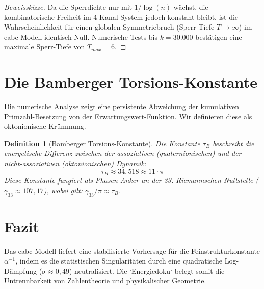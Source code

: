 \documentclass[11pt,a4paper]{article}
\newtheorem{definition}{Definition}
\begin{document}
	\begin{proof}[Beweisskizze]
		Da die Sperrdichte nur mit $1/\log(n)$ wächst, die kombinatorische Freiheit im 4-Kanal-System jedoch konstant bleibt, ist die Wahrscheinlichkeit für einen globalen Symmetriebruch (Sperr-Tiefe $T \to \infty$) im eabc-Modell identisch Null. Numerische Tests bis $k=30.000$ bestätigen eine maximale Sperr-Tiefe von $T_{max} = 6$.
	\end{proof}
	
	\section{Die Bamberger Torsions-Konstante}
	
	Die numerische Analyse zeigt eine persistente Abweichung der kumulativen Primzahl-Besetzung von der Erwartungswert-Funktion. Wir definieren diese als oktonionische Krümmung.
	
	\begin{definition}[Bamberger Torsions-Konstante]
		Die Konstante $\tau_B$ beschreibt die energetische Differenz zwischen der assoziativen (quaternionischen) und der nicht-assoziativen (oktonionischen) Dynamik:
		\begin{equation}
			\tau_B \approx 34,518 \approx 11 \cdot \pi
		\end{equation}
		Diese Konstante fungiert als Phasen-Anker an der 33. Riemannschen Nullstelle ($\gamma_{33} \approx 107,17$), wobei gilt: $\gamma_{33} / \pi \approx \tau_B$.
	\end{definition}
	
	\section{Fazit}
	Das eabc-Modell liefert eine stabilisierte Vorhersage für die Feinstrukturkonstante $\alpha^{-1}$, indem es die statistischen Singularitäten durch eine quadratische Log-Dämpfung ($\sigma \approx 0,49$) neutralisiert. Die `Energiedoku` belegt somit die Untrennbarkeit von Zahlentheorie und physikalischer Geometrie.
	
\end{document}
